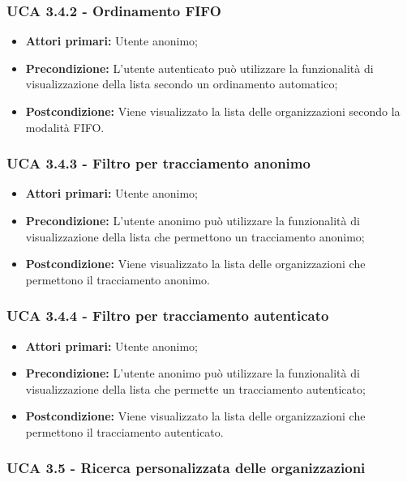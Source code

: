 \subsubsection{UCA 3.4.2 - Ordinamento FIFO}%
\begin{itemize}	
	\item \textbf{Attori primari:} Utente anonimo;
	\item \textbf{Precondizione:} L'utente autenticato può utilizzare la funzionalità di visualizzazione della lista secondo un ordinamento automatico;
	\item \textbf{Postcondizione:} Viene visualizzato la lista delle organizzazioni secondo la modalità FIFO.
\end{itemize}

\subsubsection{UCA 3.4.3 - Filtro per tracciamento anonimo}%
\begin{itemize}
	\item \textbf{Attori primari:} Utente anonimo;
	\item \textbf{Precondizione:} L'utente anonimo può utilizzare la funzionalità di visualizzazione della lista che permettono un tracciamento anonimo;
	\item \textbf{Postcondizione:} Viene visualizzato la lista delle organizzazioni che permettono il tracciamento anonimo.
\end{itemize}

\subsubsection{UCA 3.4.4 - Filtro per tracciamento autenticato}%
\begin{itemize}
	\item \textbf{Attori primari:} Utente anonimo;
	\item \textbf{Precondizione:} L'utente anonimo può utilizzare la funzionalità di visualizzazione della lista che permette un tracciamento autenticato;
	\item \textbf{Postcondizione:} Viene visualizzato la lista delle organizzazioni che permettono il tracciamento autenticato.
\end{itemize}



\subsubsection{UCA 3.5 - Ricerca personalizzata delle organizzazioni}%

